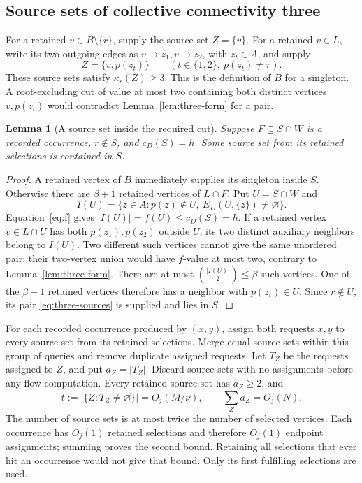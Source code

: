 \documentclass[11pt]{article}
\newtheorem{lemma}[theorem]{Lemma}
\theoremstyle{definition}
\theoremstyle{remark}
\newcommand{\OO}{\widetilde O}
\begin{document}
\subsection{Source sets of collective connectivity three}
For a retained \(v\in B\setminus\{r\}\), supply the source set \(Z=\{v\}\). For a retained \(v\in L\), write its two outgoing edges as \(v\to z_1,v\to z_2\), with \(z_t\in A\), and supply
\begin{equation}
 Z=\{v,p(z_t)\}\qquad(t\in\{1,2\},\ p(z_t)\ne r).
 \label{eq:three-sources}
\end{equation}
These source sets satisfy \(\kappa_r(Z)\ge3\). This is the definition of \(B\) for a singleton. A root-excluding cut of value at most two containing both distinct vertices \(v,p(z_t)\) would contradict Lemma~\ref{lem:three-form} for a pair.

\begin{lemma}[A source set inside the required cut]
\label{lem:three-coverage}
Suppose \(F\subseteq S\cap W\) is a recorded occurrence, \(r\notin S\), and \(c_D(S)=h\). Some source set from its retained selections is contained in \(S\).
\end{lemma}
\begin{proof}
A retained vertex of \(B\) immediately supplies its singleton inside \(S\). Otherwise there are \(\beta+1\) retained vertices of \(L\cap F\). Put \(U=S\cap W\) and
\[
 I(U)=\{z\in A:p(z)\notin U,\ E_D(U,\{z\})\ne\varnothing\}.
\]
Equation~\eqref{eq:f} gives \(|I(U)|=f(U)\le c_D(S)=h\). If a retained vertex \(v\in L\cap U\) has both \(p(z_1),p(z_2)\) outside \(U\), its two distinct auxiliary neighbors belong to \(I(U)\). Two different such vertices cannot give the same unordered pair: their two-vertex union would have \(f\)-value at most two, contrary to Lemma~\ref{lem:three-form}. There are at most \(\binom{|I(U)|}{2}\le\beta\) such vertices. One of the \(\beta+1\) retained vertices therefore has a neighbor with \(p(z_t)\in U\). Since \(r\notin U\), its pair \eqref{eq:three-sources} is supplied and lies in \(S\).
\end{proof}

For each recorded occurrence produced by \((x,y)\), assign both requests \(x,y\) to every source set from its retained selections. Merge equal source sets within this group of queries and remove duplicate assigned requests. Let \(T_Z\) be the requests assigned to \(Z\), and put \(a_Z=|T_Z|\). Discard source sets with no assignments before any flow computation. Every retained source set has \(a_Z\ge2\), and
\begin{equation}
 t:=|\{Z:T_Z\ne\varnothing\}|=\OO_j(M/\nu),
 \qquad \sum_Z a_Z=O_j(N).
 \label{eq:assignment-sums}
\end{equation}
The number of source sets is at most twice the number of selected vertices. Each occurrence has \(O_j(1)\) retained selections and therefore \(O_j(1)\) endpoint assignments; summing proves the second bound. Retaining all selections that ever hit an occurrence would not give that bound. Only its first fulfilling selections are used.
\end{document}
